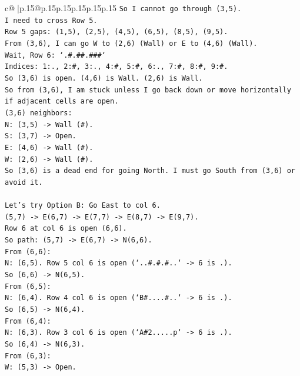 \documentclass{article}
\begin{document}
{\begin{supertabular}{c@{$\;$}|p{.15\linewidth}@{}p{.15\linewidth}p{.15\linewidth}p{.15\linewidth}p{.15\linewidth}p{.15\linewidth}}
{{{\texttt{So I cannot go through (3,5).} \\
\texttt{I need to cross Row 5.} \\
\texttt{Row 5 gaps: (1,5), (2,5), (4,5), (6,5), (8,5), (9,5).} \\
\texttt{From (3,6), I can go W to (2,6) (Wall) or E to (4,6) (Wall).} \\
\texttt{Wait, Row 6: `.\#.\#\#.\#\#\#`} \\
\texttt{Indices: 1:., 2:\#, 3:., 4:\#, 5:\#, 6:., 7:\#, 8:\#, 9:\#.} \\
\texttt{So (3,6) is open. (4,6) is Wall. (2,6) is Wall.} \\
\texttt{So from (3,6), I am stuck unless I go back down or move horizontally if adjacent cells are open.} \\
\texttt{(3,6) neighbors:} \\
\texttt{N: (3,5) {-}> Wall (\#).} \\
\texttt{S: (3,7) {-}> Open.} \\
\texttt{E: (4,6) {-}> Wall (\#).} \\
\texttt{W: (2,6) {-}> Wall (\#).} \\
\texttt{So (3,6) is a dead end for going North. I must go South from (3,6) or avoid it.} \\
\\ 
\texttt{Let's try Option B: Go East to col 6.} \\
\texttt{(5,7) {-}> E(6,7) {-}> E(7,7) {-}> E(8,7) {-}> E(9,7).} \\
\texttt{Row 6 at col 6 is open (6,6).} \\
\texttt{So path: (5,7) {-}> E(6,7) {-}> N(6,6).} \\
\texttt{From (6,6):} \\
\texttt{N: (6,5). Row 5 col 6 is open (`..\#.\#.\#..` {-}> 6 is .).} \\
\texttt{So (6,6) {-}> N(6,5).} \\
\texttt{From (6,5):} \\
\texttt{N: (6,4). Row 4 col 6 is open (`B\#....\#..` {-}> 6 is .).} \\
\texttt{So (6,5) {-}> N(6,4).} \\
\texttt{From (6,4):} \\
\texttt{N: (6,3). Row 3 col 6 is open (`A\#2.....p` {-}> 6 is .).} \\
\texttt{So (6,4) {-}> N(6,3).} \\
\texttt{From (6,3):} \\
\texttt{W: (5,3) {-}> Open.} \\
}}}
\end{supertabular}}
\end{document}
